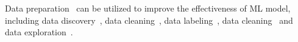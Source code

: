 

Data preparation~\cite{chai2020crowdchart} can be utilized to improve the effectiveness of ML model, including data discovery~\cite{liu2021automatic, chai2022selective, liu2022feature},  data cleaning~\cite{hao2020outdated,chai2020human}, data labeling~\cite{chai2016cost, chai2018partial, li2018cdb}, data cleaning~\cite{miao2022experimental, gao2018query,miao2018incomplete, miao2021efficient,wu2022interactive,ge2020hybrid} and data exploration~\cite{qin2020interactively,qin2021ranking}.